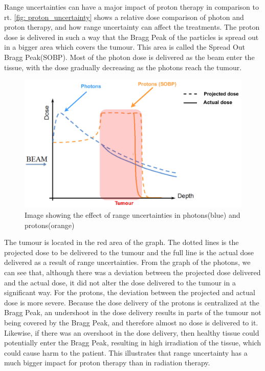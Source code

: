 \documentclass[main.tex]{subfiles}
\begin{document}
Range uncertainties can have a major impact of proton therapy in comparison to \gls{rt}. \autoref{fig: proton_uncertainty} shows a relative dose comparison of photon and proton therapy, and how range uncertainty can affect the treatments. The proton dose is delivered in such a way that the Bragg Peak of the particles is spread out in a bigger area which covers the tumour. This area is called the Spread Out Bragg Peak(SOBP). Most of the photon dose is delivered as the beam enter the tissue, with the dose gradually decreasing as the photons reach the tumour.

\begin{figure}[!htpb]
    \centering
    \includegraphics[width=12cm ]{images/projected_dose_graph.pdf}
    \caption{Image showing the effect of range uncertainties in photons(blue) and protons(orange)\cite{proton_challenges}}
    \label{fig: proton_uncertainty}
\end{figure}
\FloatBarrier


The tumour is located in the red area of the graph. The dotted lines is the projected dose to be delivered to the tumour and the full line is the actual dose delivered as a result of range uncertainties. From the graph of the photons, we can see that, although there was a deviation between the projected dose delivered and the actual dose, it did not alter the dose delivered to the tumour in a significant way. For the protons, the deviation between the projected and actual dose is more severe. Because the dose delivery of the protons is centralized at the Bragg Peak, an undershoot in the dose delivery results in parts of the tumour not being covered by the Bragg Peak, and therefore almost no dose is delivered to it. Likewise, if there was an overshoot in the dose delivery, then healthy tissue could potentially enter the Bragg Peak, resulting in high irradiation of the tissue, which could cause harm to the patient. This illustrates that range uncertainty has a much bigger impact for proton therapy than in radiation therapy.
\end{document}
